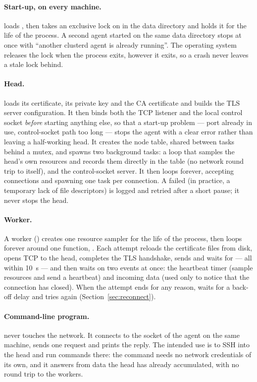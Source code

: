 \documentclass{article}
\begin{document}
\paragraph{Start-up, on every machine.}
 loads , then takes an exclusive lock
on  in the data directory and holds it for the life
of the process. A second agent started on the same data directory stops
at once with ``another clusterd agent is already running''. The operating
system releases the lock when the process exits, however it exits, so a
crash never leaves a stale lock behind.

\paragraph{Head.}
 loads its certificate, its private key and the CA
certificate and builds the TLS server configuration. It then binds both
the TCP listener and the local control socket \emph{before} starting
anything else, so that a start-up problem --- port already in use,
control-socket path too long --- stops the agent with a clear error
rather than leaving a half-working head. It creates the node table,
shared between tasks behind a mutex, and spawns two background tasks: a
loop that samples the head's own resources and records them directly in
the table (no network round trip to itself), and the control-socket
server. It then loops forever, accepting connections and spawning one
task per connection. A failed  (in practice, a temporary
lack of file descriptors) is logged and retried after a short pause; it
never stops the head.

\paragraph{Worker.}
A worker () creates one resource sampler for the life of
the process, then loops forever around one function,
. Each attempt reloads the certificate files
from disk, opens TCP to the head, completes the TLS handshake, sends
 and waits for  --- all within 10~s --- and
then waits on two events at once: the heartbeat timer (sample resources
and send a heartbeat) and incoming data (used only to notice that the
connection has closed). When the attempt ends for any reason,
 waits for a back-off delay and tries again
(Section~\ref{sec:reconnect}).

\paragraph{Command-line program.}
 never touches the network. It connects to the
 socket of the agent on the same machine, sends one
request and prints the reply. The intended use is to SSH into the head
and run commands there: the command needs no network credentials of its
own, and it answers from data the head has already accumulated, with no
round trip to the workers.
\end{document}
